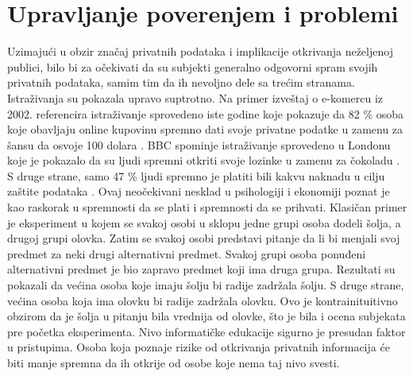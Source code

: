 \documentclass[a4paper]{article}
\begin{document}
\section{Upravljanje poverenjem i problemi}	
Uzimajući u obzir značaj privatnih podataka i implikacije otkrivanja neželjenoj publici, bilo bi za očekivati da su subjekti generalno odgovorni spram svojih privatnih podataka, samim tim da ih nevoljno dele sa trećim stranama. Istraživanja su pokazala upravo suptrotno. Na primer izveštaj o e-komercu iz 2002. referencira istraživanje sprovedeno iste godine koje pokazuje da 82 \% osoba koje obavljaju online
kupovinu spremno dati svoje privatne podatke u zamenu za šansu da osvoje 100 dolara \cite{Tedeschi}. BBC spominje istraživanje sprovedeno u Londonu koje je pokazalo da su ljudi spremni otkriti svoje lozinke u zamenu za čokoladu \cite{BBC}. S druge strane, samo 47 \% ljudi spremno je platiti bili kakvu naknadu u cilju zaštite podataka \cite{Consumers}. Ovaj neočekivani nesklad u psihologiji i  ekonomiji poznat je kao raskorak u spremnosti da se plati i spremnosti da se prihvati. Klasičan primer je eksperiment u kojem se svakoj osobi u sklopu jedne grupi osoba dodeli šolja, a drugoj grupi olovka. Zatim se svakoj osobi
predstavi pitanje da li bi menjali svoj predmet za neki drugi alternativni predmet. Svakoj grupi osoba ponuđeni alternativni predmet je bio zapravo predmet koji ima druga grupa. Rezultati su pokazali da većina osoba koje imaju šolju bi radije zadržala šolju. S druge strane, većina osoba koja ima
olovku bi radije zadržala olovku. Ovo je kontrainituitivno obzirom da je šolja u pitanju bila vrednija od olovke, što je bila i ocena subjekata pre početka eksperimenta. Nivo informatičke edukacije sigurno je presudan faktor u pristupima. Osoba koja poznaje rizike od otkrivanja privatnih informacija će biti manje spremna da ih otkrije od osobe koje nema taj nivo svesti.
\end{document}
